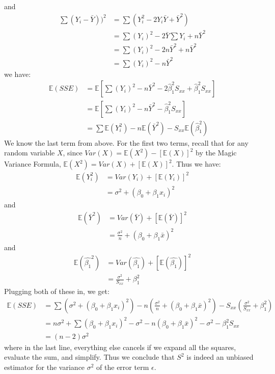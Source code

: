 \documentclass[12pt]{article}
\theoremstyle{definition}
\theoremstyle{remark}
\def\E{{\mathbb E}}
\begin{document}
and
\begin{align*}
\sum(Y_i - \bar{Y}))^2 &= \sum(Y_i^2 - 2 Y_i \bar{Y} + \bar{Y}^2 ) \\
&= \sum(Y_i)^2 - 2 \bar{Y} \sum{Y_i} + n \bar{Y}^2 \\
&= \sum(Y_i)^2 - 2 n\bar{Y}^2 + n \bar{Y}^2 \\
&= \sum(Y_i)^2 - n\bar{Y}^2 
\end{align*}
we have:
\begin{align*}
\E(SSE) &= \E \left[ \sum(Y_i)^2 - n\bar{Y}^2 - 2 \hat{\beta}_1^2 S_{xx} + \hat{\beta}_1^2 S_{xx} \right] \\
&= \E \left[ \sum(Y_i)^2 - n\bar{Y}^2 - \hat{\beta}_1^2 S_{xx} \right]\\
&= \sum \E(Y_i^2) - n \E(\bar{Y}^2) - S_{xx} \E(\hat{\beta}_1^2)
\end{align*}
We know the last term from above. For the first two terms, recall that for any random variable $X$, since $Var(X) = \E(X^2) - [\E(X)]^2$ by the Magic Variance Formula, $\E(X^2) = Var(X) + [\E(X)]^2$. Thus we have:
\begin{align*}
\E(Y_i^2) &= Var(Y_i) + [\E(Y_i)]^2 \\
&= \sigma^2 + (\beta_0 + \beta_1 x_i)^2
\end{align*}
and
\begin{align*}
\E(\bar{Y}^2) &= Var(\bar{Y}) + [\E(\bar{Y})]^2 \\
&= \frac{\sigma^2}{n} + (\beta_0 + \beta_1 \bar{x})^2
\end{align*}
and
\begin{align*}
\E(\hat{\beta_1}^2) &= Var(\hat{\beta_1}) + [\E(\hat{\beta_1})]^2 \\
&= \frac{ \sigma^2 }{S_{xx}} + \beta_1^2
\end{align*}
Plugging both of these in, we get:
\begin{align*}
\E(SSE) &= \sum (\sigma^2 + (\beta_0 + \beta_1 x_i)^2) - n \left( \frac{\sigma^2}{n} + (\beta_0 + \beta_1 \bar{x})^2 \right) - S_{xx} \left( \frac{ \sigma^2 }{S_{xx}} + \beta_1^2 \right)\\
&= n \sigma^2 + \sum (\beta_0 + \beta_1 x_i)^2 - \sigma^2 - n (\beta_0 + \beta_1 \bar{x} )^2 - \sigma^2 - \beta_1^2 S_{xx}\\
&= (n-2)\sigma^2
\end{align*}
where in the last line, everything else cancels if we expand all the squares, evaluate the sum, and simplify. Thus we conclude that $S^2$ is indeed an unbiased estimator for the variance $\sigma^2$ of the error term $\epsilon$.\\
\end{document}
